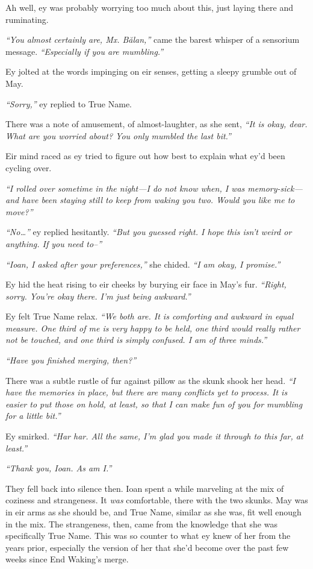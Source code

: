 Ah well, ey was probably worrying too much about this, just laying there and ruminating.

\emph{``You almost certainly are, Mx. Bălan,''} came the barest whisper of a sensorium message. \emph{``Especially if you are mumbling.''}

Ey jolted at the words impinging on eir senses, getting a sleepy grumble out of May.

\emph{``Sorry,''} ey replied to True Name.

There was a note of amusement, of almost-laughter, as she sent, \emph{``It is okay, dear. What are you worried about? You only mumbled the last bit.''}

Eir mind raced as ey tried to figure out how best to explain what ey'd been cycling over.

\emph{``I rolled over sometime in the night—I do not know when, I was memory-sick—and have been staying still to keep from waking you two. Would you like me to move?''}

\emph{``No\ldots{}''} ey replied hesitantly. \emph{``But you guessed right. I hope this isn't weird or anything. If you need to--''}

\emph{``Ioan, I asked after your preferences,''} she chided. \emph{``I am okay, I promise.''}

Ey hid the heat rising to eir cheeks by burying eir face in May's fur. \emph{``Right, sorry. You're okay there. I'm just being awkward.''}

Ey felt True Name relax. \emph{``We both are. It is comforting and awkward in equal measure. One third of me is very happy to be held, one third would really rather not be touched, and one third is simply confused. I am of three minds.''}

\emph{``Have you finished merging, then?''}

There was a subtle rustle of fur against pillow as the skunk shook her head. \emph{``I have the memories in place, but there are many conflicts yet to process. It is easier to put those on hold, at least, so that I can make fun of you for mumbling for a little bit.''}

Ey smirked. \emph{``Har har. All the same, I'm glad you made it through to this far, at least.''}

\emph{``Thank you, Ioan. As am I.''}

They fell back into silence then. Ioan spent a while marveling at the mix of coziness and strangeness. It \emph{was} comfortable, there with the two skunks. May was in eir arms as she should be, and True Name, similar as she was, fit well enough in the mix. The strangeness, then, came from the knowledge that she was specifically True Name. This was so counter to what ey knew of her from the years prior, especially the version of her that she'd become over the past few weeks since End Waking's merge.

